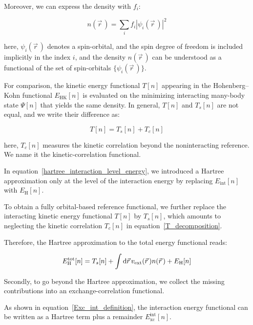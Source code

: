 Moreover, we can express the density with $f_i$:

\begin{equation}
    n(\vec{r}\,)=\sum_i f_i |\psi_i(\vec{r}\,)|^2
\label{density_with_occupation_number}
\end{equation}

here, $\psi_i(\vec{r}\,)$ denotes a spin-orbital, and the spin degree of freedom is included implicitly in the index $i$,
and the density $n(\vec{r}\,)$ can be understood as a functional of the set of spin-orbitals $\{\psi_i(\vec{r}\,)\}$.

For comparison, the kinetic energy functional $T[n]$ appearing in the Hohenberg--Kohn functional $E_\mathrm{HK}[n]$ is evaluated on the minimizing interacting many-body state $\Psi[n]$ that yields the same density.
In general, $T[n]$ and $T_s[n]$ are not equal, and we write their difference as:

\begin{equation}
    T[n]=T_s[n]+T_c[n]
\label{T_decomposition}
\end{equation}

here, $T_c[n]$ measures the kinetic correlation beyond the noninteracting reference.
We name it the kinetic-correlation functional.

In equation~\eqref{hartree_interaction_level_energy}, we introduced a Hartree approximation only at the level of the interaction energy by replacing $E_\mathrm{int}[n]$ with $E_\mathrm{H}[n]$.

To obtain a fully orbital-based reference functional,
we further replace the interacting kinetic energy functional $T[n]$ by $T_s[n]$,
which amounts to neglecting the kinetic correlation $T_c[n]$ in equation~\eqref{T_decomposition}.

Therefore, the Hartree approximation to the total energy functional reads:

\begin{equation}
    E_\mathrm{H}^\mathrm{tot}[n]
    = T_s[n]
    + \int \mathrm{d}{\vec{r}}\,v_\mathrm{ext}(\vec{r}\,)n(\vec{r}\,)
    + E_\mathrm{H}[n]
\label{hartree_total_energy_functional}
\end{equation}

Secondly, to go beyond the Hartree approximation,
we collect the missing contributions into an exchange-correlation functional.

As shown in equation~\eqref{Exc_int_definition},
the interaction energy functional can be written as a Hartree term plus a remainder $E_\mathrm{xc}^{\mathrm{int}}[n]$.

